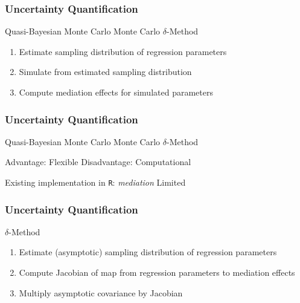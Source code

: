 \documentclass[14pt]{beamer}
\begin{document}
\begin{frame}
    \frametitle{Uncertainty Quantification}
    \begin{outline}
        \1 Quasi-Bayesian Monte Carlo
            \2 Monte Carlo $\delta$-Method \newline
        \end{outline}

        \begin{enumerate}
            \item Estimate sampling distribution of regression parameters
            \item Simulate from estimated sampling distribution
            \item Compute mediation effects for simulated parameters
        \end{enumerate}
\end{frame}

\begin{frame}
    \frametitle{Uncertainty Quantification}
    \begin{outline}
        \1 Quasi-Bayesian Monte Carlo
            \2 Monte Carlo $\delta$-Method \newline

        \1 Advantage: Flexible        
        \1 Disadvantage: Computational \newline

        \1 Existing implementation in \texttt{R}: \textit{mediation}
            \2 Limited
        \end{outline}
\end{frame}




\begin{frame}
    \frametitle{Uncertainty Quantification}
    \begin{outline}
        \1 $\delta$-Method \newline
        \end{outline}

        \begin{enumerate}
            \item Estimate (asymptotic) sampling distribution of regression parameters
            \item Compute Jacobian of map from regression parameters to mediation effects
            \item Multiply asymptotic covariance by Jacobian
        \end{enumerate}
\end{frame}
\end{document}
